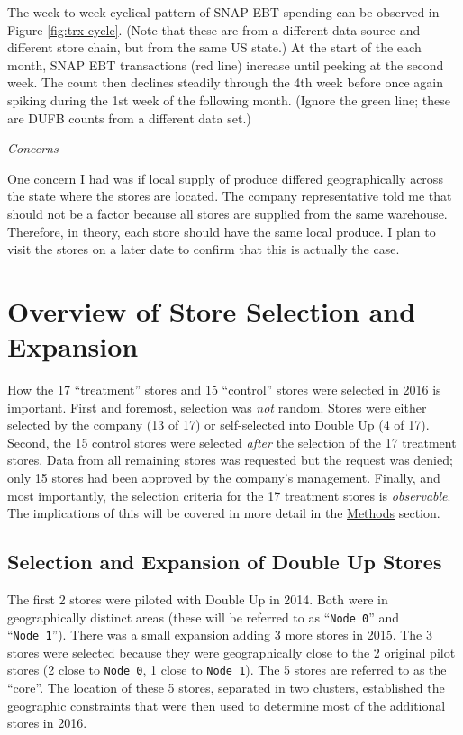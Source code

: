 \documentclass[12pt,letterpaperpaper,]{book}
\begin{document}
The week-to-week cyclical pattern of SNAP EBT spending can be observed
in Figure \ref{fig:trx-cycle}. (Note that these are from a different
data source and different store chain, but from the same US state.) At
the start of the each month, SNAP EBT transactions (red line) increase
until peeking at the second week. The count then declines steadily
through the 4th week before once again spiking during the 1st week of
the following month. (Ignore the green line; these are DUFB counts from
a different data set.)

\emph{Concerns}

One concern I had was if local supply of produce differed geographically
across the state where the stores are located. The company
representative told me that should not be a factor because all stores
are supplied from the same warehouse. Therefore, in theory, each store
should have the same local produce. I plan to visit the stores on a
later date to confirm that this is actually the case.

\hypertarget{store-selection-1}{\section*{Overview of Store Selection
and Expansion}\label{store-selection-1}}

How the 17 ``treatment'' stores and 15 ``control'' stores were selected
in 2016 is important. First and foremost, selection was \emph{not}
random. Stores were either selected by the company (13 of 17) or
self-selected into Double Up (4 of 17). Second, the 15 control stores
were selected \emph{after} the selection of the 17 treatment stores.
Data from all remaining stores was requested but the request was denied;
only 15 stores had been approved by the company's management. Finally,
and most importantly, the selection criteria for the 17 treatment stores
is \emph{observable}. The implications of this will be covered in more
detail in the \protect\hyperlink{methods}{Methods} section.

\subsection*{Selection and Expansion of Double Up
Stores}\label{selection-and-expansion-of-double-up-stores}

The first 2 stores were piloted with Double Up in 2014. Both were in
geographically distinct areas (these will be referred to as
``\texttt{Node\ 0}'' and ``\texttt{Node\ 1}''). There was a small
expansion adding 3 more stores in 2015. The 3 stores were selected
because they were geographically close to the 2 original pilot stores (2
close to \texttt{Node\ 0}, 1 close to \texttt{Node\ 1}). The 5 stores
are referred to as the ``core''. The location of these 5 stores,
separated in two clusters, established the geographic constraints that
were then used to determine most of the additional stores in 2016.
\end{document}
